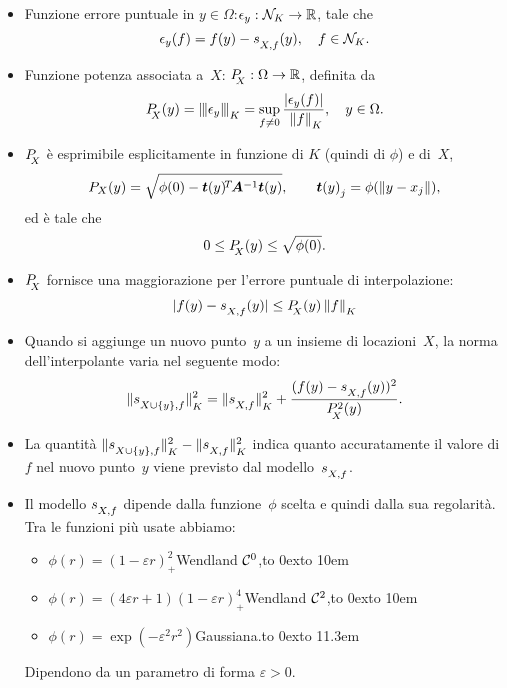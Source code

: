 \documentclass[10pt]{beamer}
\theoremstyle{definition}
\theoremstyle{plain}
\def\R{\mathbb R}
\def\Cal#1{{\cal #1}}
\def\norm#1{\Vert #1\Vert}
\def\opnorm#1{|\mskip-1.5mu|\mskip-1.5mu|#1|\mskip-1.5mu|\mskip-1.5mu|}
\def\hbyw#1#2{\vbox to #1{\vfil \hbox to #2{\hfil}}}
\def\lK{{\lower.5ex\hbox{$\scriptstyle K$}}}
\def\lX{{\!\!\lower.5ex\hbox{$\scriptstyle X$}}}
\def\lXf{{\lower.5ex\hbox{$\scriptstyle X, f$}}}
\def\lXyf{{\lower.5ex\hbox{$\scriptstyle X\cup\{y\}, f$}}}
\begin{document}
\begin{frame}
\begin{itemize}
\item
Funzione \alert{errore puntuale} in $y\in\Omega$:\quad $\epsilon_y:\Cal N_K\to\R$, tale che 
$$
\epsilon_y(f) = f(y)-s_\lXf(y),\quad f\in\Cal N_K.
$$

\item
\alert{Funzione potenza} associata a~$X$: \quad $P_{\lX}:\Omega\to\R$, definita da
$$
P_\lX(y) = \opnorm{\epsilon_y}_\lK = \sup_{f\neq 0} \frac{|\epsilon_y(f)|}{\,\,\norm f_\lK}, \quad y\in\Omega.
$$

\item 
$P_\lX$ è esprimibile esplicitamente in funzione di $K$ (quindi di $\phi$) e di~$X$,
$$
P_X(y) = \sqrt{\phi(0)-\bm t(y)^{\!T\!}\bm A^{-1} \bm t(y)},\qquad \bm t(y)_{\lower.4ex\hbox{$\scriptstyle j$}} = \phi(\norm{y-x_j}),
$$
ed è tale che
$$
0\leq P_\lX(y)\leq\sqrt{\phi(0)}.
$$


\item
$P_\lX$ fornisce una maggiorazione per  l’errore puntuale di interpolazione:
$$
|f(y)-s_\lXf(y)| \leq P_\lX(y)\, \norm f_\lK
$$

\end{itemize}


\end{frame}


\begin{frame}
\begin{itemize}
\item
 Quando si aggiunge un nuovo punto~$y$ a un insieme di locazioni~$X$, la norma dell’interpolante varia nel seguente modo:
$$
\norm{s_\lXyf}^2_\lK = \norm{s_\lXf}^2_\lK + \frac{(f(y) - s_\lXf(y))^2}{P^2_\lX(y)}.
$$
\item
La quantità $\norm{s_\lXyf}^2_\lK - \norm{s_\lXf}^2_\lK$ indica quanto accuratamente il valore di $f$ nel nuovo punto~$y$ viene previsto dal modello~$s_\lXf$.

\item
Il modello $s_\lXf$ dipende dalla funzione~$\phi$ scelta e quindi dalla sua regolarità.  Tra le funzioni più usate abbiamo:
\begin{itemize}
\item $\phi(r) =  (1- \varepsilon r)_+^2$\hfill Wendland $\Cal C^0$,\hbyw{0ex}{10em}
\item $\phi(r) = (4\varepsilon r+1)(1-\varepsilon r)^4_+$\hfill Wendland $\Cal C^2$,\hbyw{0ex}{10em}
\item $\phi(r) = \exp(-\varepsilon^2 r^2)$\hfill Gaussiana.\hbyw{0ex}{11.3em}
\end{itemize}
Dipendono da un parametro di forma $\varepsilon>0$.
\end{itemize}
\end{frame}
\end{document}
